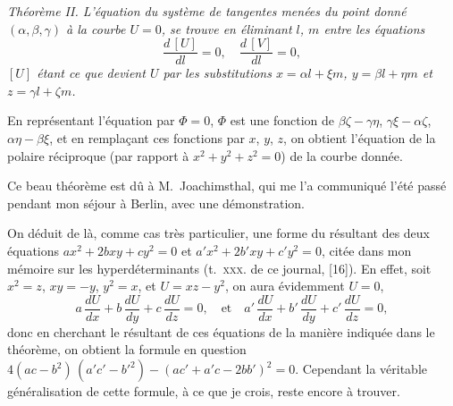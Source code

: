 \documentclass[12pt,a4paper]{article}
\theoremstyle{plain}
\begin{document}
\smallskip
\textit{Th\'eor\`eme II. L'\'equation du syst\`eme de tangentes men\'ees du point donn\'e $(\alpha, \beta, \gamma)$ \`a la courbe $U = 0$, se trouve en \'eliminant $l$, $m$ entre les \'equations
\[
\frac{d\,[U]}{dl} = 0, \quad \frac{d\,[V]}{dl} = 0,
\]
$[U]$ \'etant ce que devient $U$ par les substitutions $x = \alpha l + \xi m$, $y = \beta l + \eta m$ et $z = \gamma l + \zeta m$.}
\smallskip

En repr\'esentant l'\'equation par $\Phi = 0$, $\Phi$ est une fonction de $\beta\zeta - \gamma\eta$, $\gamma\xi - \alpha\zeta$, $\alpha\eta - \beta\xi$, et en rempla\c{c}ant ces fonctions par $x$, $y$, $z$, on obtient l'\'equation de la polaire r\'eciproque (par rapport \`a $x^2 + y^2 + z^2 = 0$) de la courbe donn\'ee.

Ce beau th\'eor\`eme est d\^u \`a M.~Joachimsthal, qui me l'a communiqu\'e l'\'et\'e pass\'e pendant mon s\'ejour \`a Berlin, avec une d\'emonstration.

On d\'eduit de l\`a, comme cas tr\`es particulier, une forme du r\'esultant des deux \'equations $ax^2 + 2bxy + cy^2 = 0$ et $a'x^2 + 2b'xy + c'y^2 = 0$, cit\'ee dans mon m\'emoire sur les hyperd\'eterminants (t.~\textsc{xxx}. de ce journal, [16]). En effet, soit $x^2 = z$, $xy = -y$, $y^2 = x$, et $U = xz - y^2$, on aura \'evidemment $U = 0$,
\[
a\,\frac{dU}{dx} + b\,\frac{dU}{dy} + c\,\frac{dU}{dz} = 0, \quad \text{et} \quad a'\,\frac{dU}{dx} + b'\,\frac{dU}{dy} + c'\,\frac{dU}{dz} = 0,
\]
donc en cherchant le r\'esultant de ces \'equations de la mani\`ere indiqu\'ee dans le th\'eor\`eme, on obtient la formule en question $4(ac - b^2)\,(a'c' - b'^2) - (ac' + a'c - 2bb')^2 = 0$. Cependant la v\'eritable g\'en\'eralisation de cette formule, \`a ce que je crois, reste encore \`a trouver.
\end{document}
